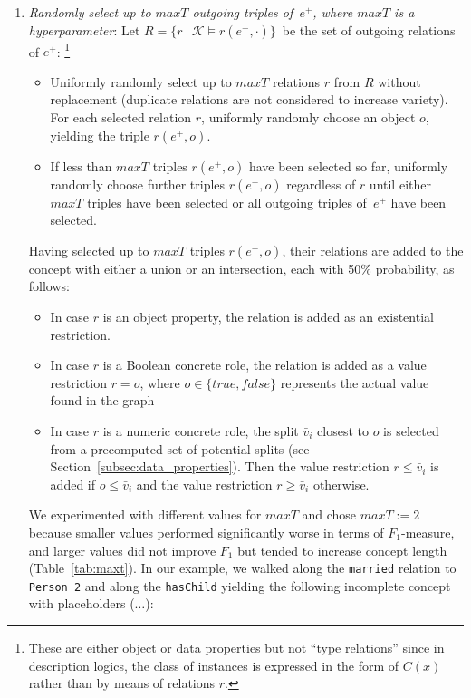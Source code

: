 \begin{enumerate}
		\item\label{item2-rw} \textit{Randomly select up to $\mathit{maxT}$ outgoing triples of~$e^{+}$, where $\mathit{maxT}$ is a hyperparameter}: Let $R = \{r \ | \ \mathcal{K} \models r(e^+, \cdot)\}$\ be the set of outgoing relations of $e^{+}$:%
\footnote{These are either object or data properties but not ``type relations'' since in description logics, the class of instances is expressed in the form of $C(x)$ rather than by means of relations $r$.}
		\begin{itemize}[noitemsep,topsep=0pt]
		    \item Uniformly randomly select up to $\mathit{maxT}$ relations $r$ from $R$ without replacement (duplicate relations are not considered to increase variety). For each selected relation $r$, uniformly randomly choose an object $o$, yielding the triple $r(e^{+}, o)$.
		    \item If less than $\mathit{maxT}$ triples $r(e^{+}, o)$ have been selected so far, uniformly randomly choose further triples $r(e^{+}, o)$ regardless of $r$ until either $\mathit{maxT}$ triples have been selected or all outgoing triples of~$e^{+}$ have been selected.
		\end{itemize}
		Having selected up to $\mathit{maxT}$ triples $r(e^{+}, o)$, their relations are added to the concept with either a union or an intersection, each with 50\% probability, as follows:
		\begin{itemize}[noitemsep,topsep=0pt]
		  \item In case $r$ is an object property, the relation is added as an existential restriction.
		  \item In case $r$ is a Boolean concrete role, the relation is added as a value restriction $r=o$, where $o \in \{\mathit{true}, \mathit{false}\}$ represents the actual value found in the graph
		  \item In case $r$ is a numeric concrete role, the split $\bar{v}_i$ closest to $o$ is selected from a precomputed set of potential splits (see Section~\ref{subsec:data_properties}). Then the value restriction $r \leq \bar{v}_i$ is added if $o \leq \bar{v}_i$ and the value restriction $r \geq \bar{v}_i$ otherwise.
		\end{itemize}
		We experimented with different values for $\mathit{maxT}$ and chose $\mathit{maxT}:=2$ because smaller values performed significantly worse in terms of $F_1$-measure, and larger values did not improve $F_1$ but tended to increase concept length (Table~\ref{tab:maxt}).
		In our example, we walked along the \texttt{married} relation to \texttt{Person~2} and along the \texttt{hasChild} yielding the following incomplete concept with placeholders ($\ldots$):
		

\end{enumerate}
